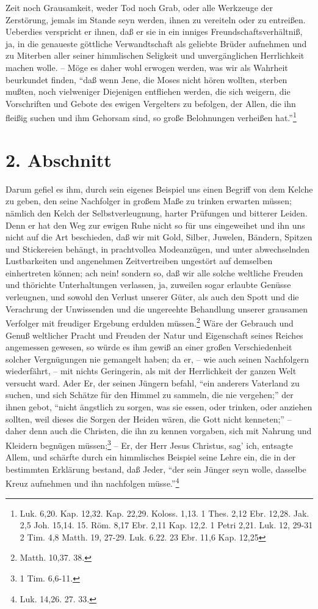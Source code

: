 Zeit noch Grausamkeit, weder Tod noch Grab, oder alle Werkzeuge der Zerstörung,
jemals im Stande seyn werden, ihnen zu vereiteln oder zu entreißen. Ueberdies
verspricht er ihnen, daß er sie in ein inniges Freundschaftsverhältniß, ja, in
die genaueste göttliche Verwandtschaft als geliebte Brüder aufnehmen und zu
Miterben aller seiner himmlischen Seligkeit und unvergänglichen Herrlichkeit
machen wolle. -- Möge es daher wohl erwogen werden, was wir als Wahrheit
beurkundet finden, "`daß wenn Jene, die Moses nicht hören wollten, sterben
mußten, noch vielweniger Diejenigen entfliehen werden, die sich weigern, die
Vorschriften und Gebote des ewigen Vergelters zu befolgen, der Allen, die ihn
fleißig suchen und ihm Gehorsam sind, so große Belohnungen verheißen
hat."'\footnote{Luk. 6,20. Kap. 12,32. Kap. 22,29. Koloss. 1,13. 1 Thes. 2,12
Ebr. 12,28. Jak. 2,5 Joh. 15,14. 15. Röm. 8,17 Ebr. 2,11  Kap. 12,2. 1 Petri
2,21. Luk. 12, 29-31 2 Tim. 4,8 Matth. 19, 27-29. Luk. 6.22. 23 Ebr. 11,6 Kap.
12,25}

\section{2. Abschnitt} \label{kap16_ab2}

Darum gefiel es ihm, durch sein eigenes Beispiel uns einen Begriff von dem
Kelche zu geben, den seine Nachfolger in großem Maße zu trinken erwarten müssen;
nämlich den Kelch der Selbstverleugnung, harter Prüfungen und bitterer Leiden.
Denn er hat den Weg zur ewigen Ruhe nicht so für uns eingeweihet und ihn uns
nicht auf die Art beschieden, daß wir mit Gold, Silber, Juwelen, Bändern,
Spitzen und Stickereien behängt, in prachtvollea Modeanzügen, und unter
abwechselnden Lustbarkeiten und angenehmen Zeitvertreiben ungestört auf
demselben einhertreten können; ach nein! sondern so, daß wir alle solche
weltliche Freuden und thörichte Unterhaltungen verlassen, ja, zuweilen sogar
erlaubte Genüsse verleugnen, und sowohl den Verlust unserer Güter, als auch den
Spott und die Verachrung der Unwissenden und die ungereehte Behandlung unserer
grausamen Verfolger mit freudiger Ergebung erdulden müssen.\footnote{Matth.
10,37. 38. } Wäre der Gebrauch und Genuß weltlicher Pracht und Freuden der Natur
und Eigenschaft seines Reiches angemessen gewesen, so würde es ihm gewiß an
einer großen Verschiedenheit solcher Vergnügungen nie gemangelt haben; da er, --
wie auch seinen Nachfolgern wiederfährt, -- mit nichts Geringerin, als mit der
Herrlichkeit der ganzen Welt versucht ward. Ader Er, der seinen Jüngern befahl,
"`ein anderers Vaterland zu suchen, und sich Schätze für den Himmel zu sammeln,
die nie vergehen;"' der ihnen gebot, "`nicht ängstlich zu sorgen, was sie essen,
oder trinken, oder anziehen sollten, weil dieses die Sorgen der Heiden wären,
die Gott nicht kenneten;"' – daher denn auch die Christen, die ihn zu kennen
vorgaben, sich mit Nahrung und Kleidern begnügen müssen;\footnote{1 Tim.
6,6-11.} -- Er, der Herr Jesus Christus, sag’ ich, entsagte Allem, und schärfte
durch ein himmlisches Beispiel seine Lehre ein, die in der bestimmten Erklärung
bestand, daß Jeder, "`der sein Jünger seyn wolle, dasselbe Kreuz aufnehmen und
ihn nachfolgen müsse."'\footnote{Luk. 14,26. 27. 33.}

